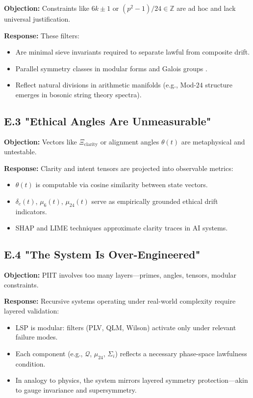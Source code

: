 \documentclass[12]{amsart}
\theoremstyle{plain}
\begin{document}
\textbf{Objection:} Constraints like $6k \pm 1$ or $(p^2 - 1)/24 \in \mathbb{Z}$ are ad hoc and lack universal justification.

\textbf{Response:}
These filters:
\begin{itemize}
  \item Are minimal sieve invariants required to separate lawful from composite drift.
  \item Parallel symmetry classes in modular forms and Galois groups \cite{serre1973}.
  \item Reflect natural divisions in arithmetic manifolds (e.g., $\text{Mod-24}$ structure emerges in bosonic string theory spectra).
\end{itemize}

\subsection*{E.3 "Ethical Angles Are Unmeasurable"}

\textbf{Objection:} Vectors like $\Xi_{\text{clarity}}$ or alignment angles $\theta(t)$ are metaphysical and untestable.

\textbf{Response:}
Clarity and intent tensors are projected into observable metrics:
\begin{itemize}
  \item $\theta(t)$ is computable via cosine similarity between state vectors.
  \item $\delta_c(t)$, $\mu_6(t)$, $\mu_{24}(t)$ serve as empirically grounded ethical drift indicators.
  \item SHAP \cite{lundberg2017} and LIME \cite{ribeiro2016} techniques approximate clarity traces in AI systems.
\end{itemize}

\subsection*{E.4 "The System Is Over-Engineered"}

\textbf{Objection:} PIIT involves too many layers—primes, angles, tensors, modular constraints.

\textbf{Response:}
Recursive systems operating under real-world complexity require layered validation:
\begin{itemize}
  \item LSP is modular: filters (PLV, QLM, Wilson) activate only under relevant failure modes.
  \item Each component (e.g., $\mathcal{Q}$, $\mu_{24}$, $\Sigma_i$) reflects a necessary phase-space lawfulness condition.
  \item In analogy to physics, the system mirrors layered symmetry protection—akin to gauge invariance and supersymmetry.
\end{itemize}
\end{document}

